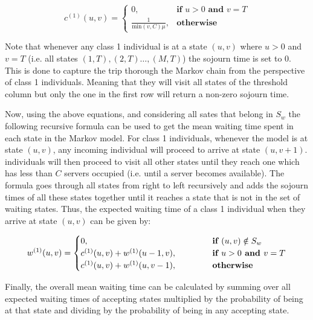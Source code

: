 \begin{equation} \label{eq:sojourn_others}
    c^{(1)}(u,v) = 
    \begin{cases}
        0, & \textbf{if } u > 0 \textbf{ and } v = T \\
        \frac{1}{\text{min}(v,C)\mu}, & \textbf{otherwise}
    \end{cases}
\end{equation}

Note that whenever any class 1 individual is at a state \((u,v)\) where 
\(u > 0\) 
and \(v = T\) (i.e. all states \((1,T), (2,T) \dots, (M,T)\)) the sojourn time is 
set to \(0\). 
This is done to capture the trip thorough the Markov chain from the perspective 
of class 1 individuals. 
Meaning that they will visit all states of the threshold column but only the one 
in the first row will return a non-zero sojourn time.

Now, using the above equations, and considering all sates that belong in \(S_w\) 
the following recursive formula can be used to get the mean waiting time spent in 
each state in the Markov model. 
For class 1 individuals, whenever the model is at state \( (u,v) \), any 
incoming 
individual will proceed to arrive at state \( (u, v+1) \). 
individuals will then proceed to visit all other states until they reach one which 
has less than \(C\) servers occupied (i.e. until a server becomes available). 
The formula goes through all states from right to left recursively and adds the 
sojourn times of all these states together until it reaches a state that is not 
in the set of waiting states. 
Thus, the expected waiting time of a class 1 individual when they arrive at 
state \( (u,v) \) can be given by:

\begin{equation} \label{eq:waiting-time-at-each-state-other}
    w^{(1)}(u,v) = 
    \begin{cases} 
        0, \hspace{4.85cm} & \textbf{if } (u,v) \notin S_w \\
        c^{(1)}(u,v) + w^{(1)}(u-1, v), & \textbf{if } u > 0 \textbf{ and } v = T \\
        c^{(1)}(u,v) + w^{(1)}(u, v-1), & \textbf{otherwise}
    \end{cases}
\end{equation}

Finally, the overall mean waiting time can be calculated by summing over all expected 
waiting times of accepting states multiplied by the probability of being at that 
state and dividing by the probability of being in any accepting state.

